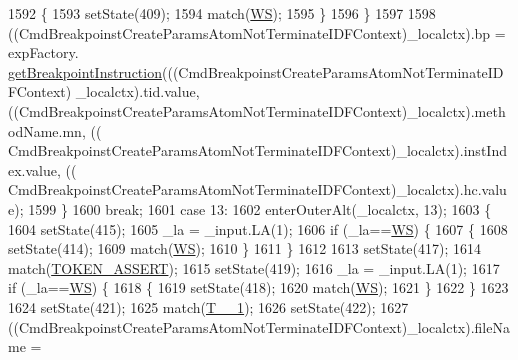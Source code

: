 \begin{DoxyCode}
1592           \{
1593           setState(409);
1594           match(\hyperlink{classgov_1_1nasa_1_1jpf_1_1inspector_1_1server_1_1expression_1_1parser_1_1_expression_grammar_parser_ace44714ae633c7b14794cc5a24d9ebf3}{WS});
1595           \}
1596         \}
1597 
1598          ((CmdBreakpoinstCreateParamsAtomNotTerminateIDFContext)\_localctx).bp =  expFactory.
      \hyperlink{classgov_1_1nasa_1_1jpf_1_1inspector_1_1server_1_1expression_1_1_expression_factory_af6432e9ae551f2ba361277a06753db2a}{getBreakpointInstruction}(((CmdBreakpoinstCreateParamsAtomNotTerminateIDFContext)
      \_localctx).tid.value, ((CmdBreakpoinstCreateParamsAtomNotTerminateIDFContext)\_localctx).methodName.mn, ((
      CmdBreakpoinstCreateParamsAtomNotTerminateIDFContext)\_localctx).instIndex.value, ((
      CmdBreakpoinstCreateParamsAtomNotTerminateIDFContext)\_localctx).hc.value); 
1599         \}
1600         \textcolor{keywordflow}{break};
1601       \textcolor{keywordflow}{case} 13:
1602         enterOuterAlt(\_localctx, 13);
1603         \{
1604         setState(415);
1605         \_la = \_input.LA(1);
1606         \textcolor{keywordflow}{if} (\_la==\hyperlink{classgov_1_1nasa_1_1jpf_1_1inspector_1_1server_1_1expression_1_1parser_1_1_expression_grammar_parser_ace44714ae633c7b14794cc5a24d9ebf3}{WS}) \{
1607           \{
1608           setState(414);
1609           match(\hyperlink{classgov_1_1nasa_1_1jpf_1_1inspector_1_1server_1_1expression_1_1parser_1_1_expression_grammar_parser_ace44714ae633c7b14794cc5a24d9ebf3}{WS});
1610           \}
1611         \}
1612 
1613         setState(417);
1614         match(\hyperlink{classgov_1_1nasa_1_1jpf_1_1inspector_1_1server_1_1expression_1_1parser_1_1_expression_grammar_parser_a5965ddc9ea8411ed43e28f73def173d2}{TOKEN\_ASSERT});
1615         setState(419);
1616         \_la = \_input.LA(1);
1617         \textcolor{keywordflow}{if} (\_la==\hyperlink{classgov_1_1nasa_1_1jpf_1_1inspector_1_1server_1_1expression_1_1parser_1_1_expression_grammar_parser_ace44714ae633c7b14794cc5a24d9ebf3}{WS}) \{
1618           \{
1619           setState(418);
1620           match(\hyperlink{classgov_1_1nasa_1_1jpf_1_1inspector_1_1server_1_1expression_1_1parser_1_1_expression_grammar_parser_ace44714ae633c7b14794cc5a24d9ebf3}{WS});
1621           \}
1622         \}
1623 
1624         setState(421);
1625         match(\hyperlink{classgov_1_1nasa_1_1jpf_1_1inspector_1_1server_1_1expression_1_1parser_1_1_expression_grammar_parser_aa7abaea5c810058ee748969dff385b9e}{T\_\_1});
1626         setState(422);
1627         ((CmdBreakpoinstCreateParamsAtomNotTerminateIDFContext)\_localctx).fileName = 

\end{DoxyCode}
